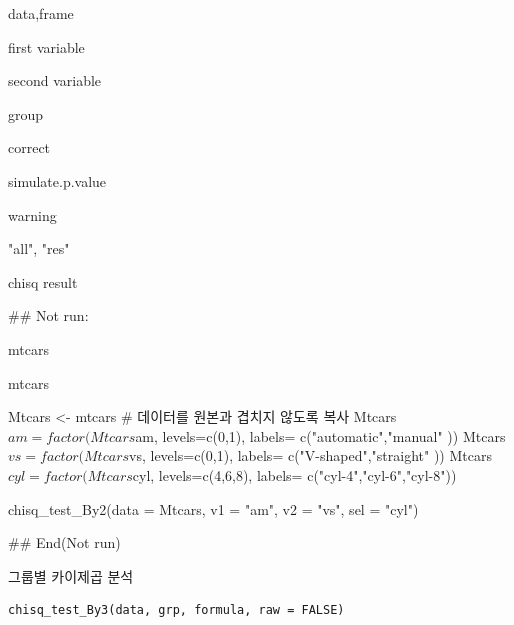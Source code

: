 \documentclass[a4paper]{book}
\begin{document}
\begin{Arguments}
\begin{ldescription}
\item[\code{data}] data,frame

\item[\code{v1}] first variable

\item[\code{v2}] second variable

\item[\code{sel}] group

\item[\code{correct}] correct

\item[\code{simulate.p.value}] simulate.p.value

\item[\code{warning}] warning

\item[\code{type}] "all", "res"
\end{ldescription}
\end{Arguments}
%
\begin{Value}
chisq result
\end{Value}
%
\begin{Examples}
\begin{ExampleCode}
\#\# Not run: 

mtcars%

mtcars%

Mtcars <- mtcars  # 데이터를 원본과 겹치지 않도록 복사
Mtcars$am = factor(Mtcars$am, levels=c(0,1), labels= c("automatic","manual" ))
Mtcars$vs = factor(Mtcars$vs, levels=c(0,1), labels= c("V-shaped","straight" ))
Mtcars$cyl = factor(Mtcars$cyl, levels=c(4,6,8),
             labels= c("cyl-4","cyl-6","cyl-8"))

chisq_test_By2(data = Mtcars, v1 = "am", v2 = "vs", sel = "cyl")


## End(Not run)




\end{ExampleCode}
\end{Examples}
%
\begin{Description}
그룹별 카이제곱 분석
\end{Description}
%
\begin{Usage}
\begin{verbatim}
chisq_test_By3(data, grp, formula, raw = FALSE)
\end{verbatim}
\end{Usage}
\end{document}
